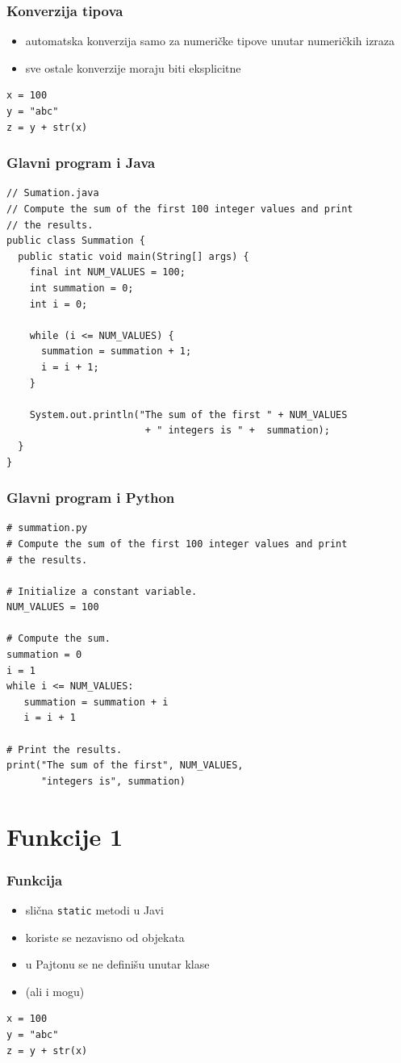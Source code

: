 \documentclass[compress]{beamer}
\begin{document}
\begin{frame}[fragile]
\frametitle{Konverzija tipova}
\begin{itemize}
  \item automatska konverzija samo za numeričke tipove unutar numeričkih izraza
  \item sve ostale konverzije moraju biti eksplicitne
\end{itemize}
\begin{verbatim}
x = 100
y = "abc"
z = y + str(x)
\end{verbatim}
\end{frame}

\begin{frame}[fragile]
\frametitle{Glavni program i Java}
\begin{verbatim}
// Sumation.java
// Compute the sum of the first 100 integer values and print
// the results.
public class Summation {
  public static void main(String[] args) {
    final int NUM_VALUES = 100;
    int summation = 0;
    int i = 0;

    while (i <= NUM_VALUES) {
      summation = summation + 1;
      i = i + 1;
    }

    System.out.println("The sum of the first " + NUM_VALUES
                        + " integers is " +  summation);
  }
}
\end{verbatim}
\end{frame}
  
\begin{frame}[fragile]
\frametitle{Glavni program i Python}
\begin{verbatim}
# summation.py
# Compute the sum of the first 100 integer values and print
# the results.

# Initialize a constant variable.
NUM_VALUES = 100

# Compute the sum.
summation = 0
i = 1
while i <= NUM_VALUES:
   summation = summation + i
   i = i + 1

# Print the results.
print("The sum of the first", NUM_VALUES,
      "integers is", summation)
\end{verbatim}
\end{frame}
  
\section{Funkcije 1}

\begin{frame}[fragile]
\frametitle{Funkcija}
\begin{itemize}
  \item slična \texttt{static} metodi u Javi
  \item koriste se nezavisno od objekata
  \item u Pajtonu se ne definišu unutar klase
  \item (ali i mogu)
\end{itemize}
\begin{verbatim}
x = 100
y = "abc"
z = y + str(x)
\end{verbatim}
\end{frame}
  
\end{document}
